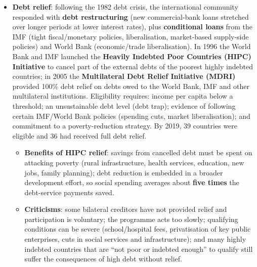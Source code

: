\begin{itemize}
  \item \textbf{Debt relief}: following the 1982 debt crisis, the international community responded with \textbf{debt restructuring} (new commercial-bank loans stretched over longer periods at lower interest rates), plus \textbf{conditional loans} from the IMF (tight fiscal/monetary policies, liberalisation, market-based supply-side policies) and World Bank (economic/trade liberalisation). In 1996 the World Bank and IMF launched the \textbf{Heavily Indebted Poor Countries (HIPC) Initiative} to cancel part of the external debts of the poorest highly indebted countries; in 2005 the \textbf{Multilateral Debt Relief Initiative (MDRI)} provided 100\% debt relief on debts owed to the World Bank, IMF and other multilateral institutions. Eligibility requires: income per capita below a threshold; an unsustainable debt level (debt trap); evidence of following certain IMF/World Bank policies (spending cuts, market liberalisation); and commitment to a poverty-reduction strategy. By 2019, 39 countries were eligible and 36 had received full debt relief.
  \begin{itemize}
    \item \textbf{Benefits of HIPC relief}: savings from cancelled debt must be spent on attacking poverty (rural infrastructure, health services, education, new jobs, family planning); debt reduction is embedded in a broader development effort, so social spending averages about \textbf{five times} the debt-service payments saved.
    \item \textbf{Criticisms}: some bilateral creditors have not provided relief and participation is voluntary; the programme acts too slowly; qualifying conditions can be severe (school/hospital fees, privatisation of key public enterprises, cuts in social services and infrastructure); and many highly indebted countries that are ``not poor or indebted enough'' to qualify still suffer the consequences of high debt without relief.
  \end{itemize}
\end{itemize}

